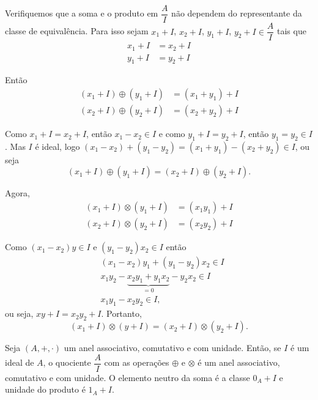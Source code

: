 \documentclass{beamer}
\begin{document}
    \begin{frame}
        Verifiquemos que a soma e o produto em $\dfrac{A}{I}$ n{\~a}o dependem do representante da classe de equival{\^e}ncia.
        Para isso sejam $x_1 + I$, $x_2 + I$, $y_1 + I$, $y_2 + I \in \dfrac{A}{I}$ tais que
        \begin{align*}
            x_1 + I &= x_2 + I\\
            y_1 + I &= y_2 + I  
        \end{align*}

        Ent{\~a}o
        \begin{align*}
            (x_1 + I) \oplus (y_1 + I) &= (x_1 + y_1) + I\\
            (x_2 + I) \oplus (y_2 + I) &= (x_2 + y_2) + I
        \end{align*}
    \end{frame}

    \begin{frame}
        Como $x_1 + I = x_2 + I$, ent{\~a}o $x_1 - x_2 \in I$ e como $y_1 + I = y_2 + I$, ent{\~a}o $y_1 = y_2 \in I$. Mas $I$ {\'e} ideal, logo $(x_1 - x_2) + (y_1 - y_2) = (x_1 + y_1) - (x_2 + y_2) \in I$, ou seja
        \[
            (x_1 + I) \oplus (y_1 + I) = (x_2 + I) \oplus (y_2 + I).
        \]
    \end{frame}

    \begin{frame}
        Agora,
        \begin{align*}
            (x_1 + I) \otimes (y_1 + I) &= (x_1y_1) + I\\
            (x_2 + I) \otimes (y_2 + I) &= (x_2y_2) + I
        \end{align*}

        Como $(x_1 - x_2)y \in I$ e $(y_1 - y_2)x_2 \in I$ ent\~ao
        \begin{align*}
            &(x_1 - x_2)y_1 + (y_1 - y_2)x_2 \in I\\
            &x_1y_2-\underbrace{x_2y_1 + y_1x_2}_{= 0} - y_2x_2 \in I\\
            &x_1y_1 - x_2y_2\in I,
        \end{align*}
        ou seja, $xy + I = x_2y_2 + I$. Portanto,
        \[
            (x_1 + I) \otimes (y + I) = (x_2 + I) \otimes (y_2 + I).
        \]
    \end{frame}

    \begin{frame}
        \begin{teorema}
            Seja $(A, +, \cdot)$ um anel associativo, comutativo e com unidade. Ent{\~a}o, se $I$ {\'e} um ideal de $A$,
            o quociente $\dfrac{A}{I}$ com as opera{\c c}{\~o}es $\oplus$ e $\otimes$ {\'e} um anel associativo,
            comutativo e com unidade. O elemento neutro da soma {\'e} a classe $0_{A} + I$ e unidade do produto {\'e} $1_{A} + I$.
        \end{teorema}
    \end{frame}
\end{document}
